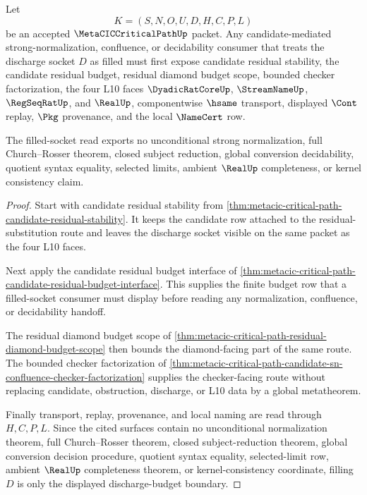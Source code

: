 \begin{theorem}
\label{thm:metacic-critical-path-visible-residual-discharge-budget}
Let
$$
K=(S,N,O,U,D,H,C,P,L)
$$
be an accepted $\MetaCICCriticalPathUp$ packet. Any candidate-mediated strong-normalization, confluence, or decidability consumer that treats the discharge socket $D$ as filled must first expose candidate residual stability, the candidate residual budget, residual diamond budget scope, bounded checker factorization, the four L10 faces $\DyadicRatCoreUp$, $\StreamNameUp$, $\RegSeqRatUp$, and $\RealUp$, componentwise $\hsame$ transport, displayed $\Cont$ replay, $\Pkg$ provenance, and the local $\NameCert$ row.

The filled-socket read exports no unconditional strong normalization, full Church--Rosser theorem, closed subject reduction, global conversion decidability, quotient syntax equality, selected limits, ambient $\RealUp$ completeness, or kernel consistency claim.
\end{theorem}
\begin{proof}
Start with candidate residual stability from \autoref{thm:metacic-critical-path-candidate-residual-stability}. It keeps the candidate row attached to the residual-substitution route and leaves the discharge socket visible on the same packet as the four L10 faces.

Next apply the candidate residual budget interface of \autoref{thm:metacic-critical-path-candidate-residual-budget-interface}. This supplies the finite budget row that a filled-socket consumer must display before reading any normalization, confluence, or decidability handoff.

The residual diamond budget scope of \autoref{thm:metacic-critical-path-residual-diamond-budget-scope} then bounds the diamond-facing part of the same route. The bounded checker factorization of \autoref{thm:metacic-critical-path-candidate-sn-confluence-checker-factorization} supplies the checker-facing route without replacing candidate, obstruction, discharge, or L10 data by a global metatheorem.

Finally transport, replay, provenance, and local naming are read through $H,C,P,L$. Since the cited surfaces contain no unconditional normalization theorem, full Church--Rosser theorem, closed subject-reduction theorem, global conversion decision procedure, quotient syntax equality, selected-limit row, ambient $\RealUp$ completeness theorem, or kernel-consistency coordinate, filling $D$ is only the displayed discharge-budget boundary.
\end{proof}

